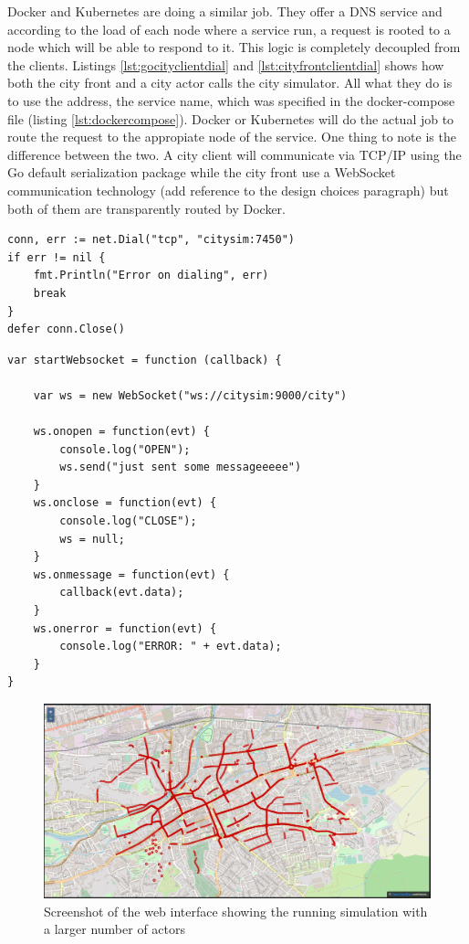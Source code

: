 \documentclass[conference]{IEEEtran}
\begin{document}
Docker and Kubernetes are doing a similar job. They offer a DNS service and according to the load of each node where a service run, a request is rooted to a node which will be able to respond to it. This logic is completely decoupled from the clients. Listings \ref{lst:gocityclientdial} and \ref{lst:cityfrontclientdial} shows how both the city front and a city actor calls the city simulator. All what they do is to use the address, the service name, which was specified in the docker-compose file (listing \ref{lst:dockercompose}). Docker or Kubernetes will do the actual job to route the request to the appropiate node of the service. One thing to note is the difference between the two. A city client will communicate via TCP/IP using the Go default serialization package while the city front use a WebSocket communication technology (add reference to the design choices paragraph) but both of them are transparently routed by Docker.

\begin{lstlisting}[caption=City actor dialing City simulator, label=lst:gocityclientdial]
conn, err := net.Dial("tcp", "citysim:7450")
if err != nil {
    fmt.Println("Error on dialing", err)
    break
}
defer conn.Close()
\end{lstlisting}

\begin{lstlisting}[caption=City front dialing City simulator, label=lst:cityfrontclientdial]
var startWebsocket = function (callback) {

    var ws = new WebSocket("ws://citysim:9000/city")

    ws.onopen = function(evt) {
        console.log("OPEN");
        ws.send("just sent some messageeeee")
    }
    ws.onclose = function(evt) {
        console.log("CLOSE");
        ws = null;
    }
    ws.onmessage = function(evt) {
        callback(evt.data);
    }
    ws.onerror = function(evt) {
        console.log("ERROR: " + evt.data);
    }
}
\end{lstlisting}

\begin{figure}
  \includegraphics[width=0.9\linewidth]{ScreenshotWebInterface2.jpg}
  \centering
  \caption{Screenshot of the web interface showing the running simulation with a larger number of actors}
  \label{fig:ScreenshotWebInterface2}
\end{figure}
\end{document}
